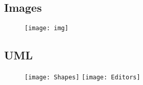 \subsection{Images}

\begin{figure}[H]
    \texttt{[image: img]}
    \centering
\end{figure}

\subsection{UML}
\begin{figure}[H]
    \texttt{[image: Shapes]}
    \texttt{[image: Editors]}
\end{figure}


